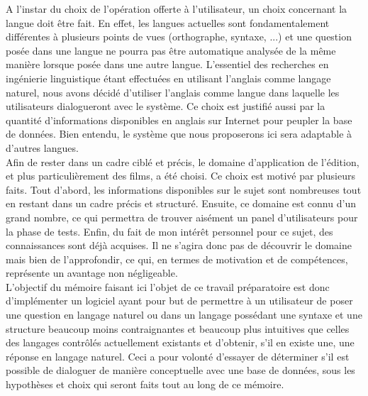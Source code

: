 \documentclass[a4paper,12pt]{article}
\begin{document}
A l'instar du choix de l'opération offerte à l'utilisateur, un choix concernant la langue doit être fait.
En effet, les langues actuelles sont fondamentalement différentes à plusieurs points de vues (orthographe, syntaxe, ...) et une question posée dans une langue ne pourra pas être automatique analysée de la même manière lorsque posée dans une autre langue.
L'essentiel des recherches en ingénierie linguistique étant effectuées en utilisant l'anglais comme langage naturel, nous avons décidé d'utiliser l'anglais comme langue dans laquelle les utilisateurs dialogueront avec le système.
Ce choix est justifié aussi par la quantité d'informations disponibles en anglais sur Internet pour peupler la base de données.
Bien entendu, le système que nous proposerons ici sera adaptable à d'autres langues. \\

Afin de rester dans un cadre ciblé et précis, le domaine d'application de l'édition, et plus particulièrement des films, a été choisi.
Ce choix est motivé par plusieurs faits.
Tout d'abord, les informations disponibles sur le sujet sont nombreuses tout en restant dans un cadre précis et structuré.
Ensuite, ce domaine est connu d'un grand nombre, ce qui permettra de trouver aisément un panel d'utilisateurs pour la phase de tests.
Enfin, du fait de mon intérêt personnel pour ce sujet, des connaissances sont déjà acquises.
Il ne s'agira donc pas de découvrir le domaine mais bien de l'approfondir, ce qui, en termes de motivation et de compétences, représente un avantage non négligeable. \\

L'objectif du mémoire faisant ici l'objet de ce travail préparatoire est donc d'implémenter un logiciel ayant pour but de permettre à un utilisateur de poser une question en langage naturel ou dans un langage possédant une syntaxe et une structure beaucoup moins contraignantes et beaucoup plus intuitives que celles des langages contrôlés actuellement existants et d'obtenir, s'il en existe une, une réponse en langage naturel.
Ceci a pour volonté d'essayer de déterminer s'il est possible de dialoguer de manière conceptuelle avec une base de données, sous les hypothèses et choix qui seront faits tout au long de ce mémoire. \\
\end{document}
